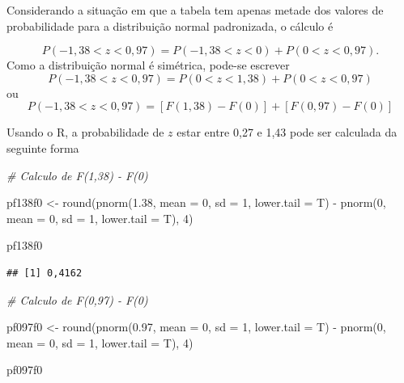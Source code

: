 \documentclass[
]{book}
\newenvironment{Shaded}{\begin{snugshade}}{\end{snugshade}}
\newcommand{\AttributeTok}[1]{\textcolor[rgb]{0.77,0.63,0.00}{#1}}
\newcommand{\CommentTok}[1]{\textcolor[rgb]{0.56,0.35,0.01}{\textit{#1}}}
\newcommand{\DecValTok}[1]{\textcolor[rgb]{0.00,0.00,0.81}{#1}}
\newcommand{\FloatTok}[1]{\textcolor[rgb]{0.00,0.00,0.81}{#1}}
\newcommand{\FunctionTok}[1]{\textcolor[rgb]{0.00,0.00,0.00}{#1}}
\newcommand{\NormalTok}[1]{#1}
\newcommand{\OtherTok}[1]{\textcolor[rgb]{0.56,0.35,0.01}{#1}}
\newcommand{\SpecialCharTok}[1]{\textcolor[rgb]{0.00,0.00,0.00}{#1}}
\begin{document}
Considerando a situação em que a tabela tem apenas metade dos valores de probabilidade para a distribuição normal padronizada, o cálculo é

\[
  P( -1,38 < z < 0,97) = P (-1,38 < z < 0) + P(0 < z < 0,97).
\]
Como a distribuição normal é simétrica, pode-se escrever
\[
  P( -1,38 < z < 0,97) = P (0 < z < 1,38) + P(0 < z < 0,97)
\]
ou
\[
  P( -1,38 < z < 0,97) = [F(1,38) - F(0)] +[F(0,97) - F(0)]
\]

Usando o R, a probabilidade de \(z\) estar entre 0,27 e 1,43 pode ser calculada da seguinte forma

\begin{Shaded}
\begin{Highlighting}[]
\CommentTok{\# Calculo de F(1,38) {-} F(0)}

\NormalTok{pf138f0 }\OtherTok{\textless{}{-}} \FunctionTok{round}\NormalTok{(}\FunctionTok{pnorm}\NormalTok{(}\FloatTok{1.38}\NormalTok{, }\AttributeTok{mean =} \DecValTok{0}\NormalTok{, }\AttributeTok{sd =} \DecValTok{1}\NormalTok{, }\AttributeTok{lower.tail =}\NormalTok{ T) }\SpecialCharTok{{-}} 
    \FunctionTok{pnorm}\NormalTok{(}\DecValTok{0}\NormalTok{, }\AttributeTok{mean =} \DecValTok{0}\NormalTok{, }\AttributeTok{sd =} \DecValTok{1}\NormalTok{, }\AttributeTok{lower.tail =}\NormalTok{ T), }\DecValTok{4}\NormalTok{)}

\NormalTok{pf138f0}
\end{Highlighting}
\end{Shaded}

\begin{verbatim}
## [1] 0,4162
\end{verbatim}

\begin{Shaded}
\begin{Highlighting}[]
\CommentTok{\# Calculo de F(0,97) {-} F(0)}

\NormalTok{pf097f0 }\OtherTok{\textless{}{-}} \FunctionTok{round}\NormalTok{(}\FunctionTok{pnorm}\NormalTok{(}\FloatTok{0.97}\NormalTok{, }\AttributeTok{mean =} \DecValTok{0}\NormalTok{, }\AttributeTok{sd =} \DecValTok{1}\NormalTok{, }\AttributeTok{lower.tail =}\NormalTok{ T) }\SpecialCharTok{{-}} 
    \FunctionTok{pnorm}\NormalTok{(}\DecValTok{0}\NormalTok{, }\AttributeTok{mean =} \DecValTok{0}\NormalTok{, }\AttributeTok{sd =} \DecValTok{1}\NormalTok{, }\AttributeTok{lower.tail =}\NormalTok{ T), }\DecValTok{4}\NormalTok{)}

\NormalTok{pf097f0}
\end{Highlighting}
\end{Shaded}
\end{document}
